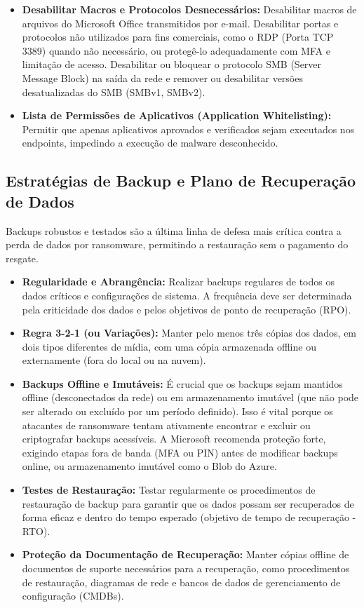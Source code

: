 \begin{itemize}
    \item \textbf{Desabilitar Macros e Protocolos Desnecessários:} Desabilitar macros de arquivos do Microsoft Office transmitidos por e-mail. Desabilitar portas e protocolos não utilizados para fins comerciais, como o RDP (Porta TCP 3389) quando não necessário, ou protegê-lo adequadamente com MFA e limitação de acesso. Desabilitar ou bloquear o protocolo SMB (Server Message Block) na saída da rede e remover ou desabilitar versões desatualizadas do SMB (SMBv1, SMBv2).
    \item \textbf{Lista de Permissões de Aplicativos (Application Whitelisting):} Permitir que apenas aplicativos aprovados e verificados sejam executados nos endpoints, impedindo a execução de malware desconhecido.
\end{itemize}

\subsection{Estratégias de Backup e Plano de Recuperação de Dados}
Backups robustos e testados são a última linha de defesa mais crítica contra a perda de dados por ransomware, permitindo a restauração sem o pagamento do resgate.
\begin{itemize}
    \item \textbf{Regularidade e Abrangência:} Realizar backups regulares de todos os dados críticos e configurações de sistema. A frequência deve ser determinada pela criticidade dos dados e pelos objetivos de ponto de recuperação (RPO).
    \item \textbf{Regra 3-2-1 (ou Variações):} Manter pelo menos três cópias dos dados, em dois tipos diferentes de mídia, com uma cópia armazenada offline ou externamente (fora do local ou na nuvem).
    \item \textbf{Backups Offline e Imutáveis:} É crucial que os backups sejam mantidos offline (desconectados da rede) ou em armazenamento imutável (que não pode ser alterado ou excluído por um período definido). Isso é vital porque os atacantes de ransomware tentam ativamente encontrar e excluir ou criptografar backups acessíveis. A Microsoft recomenda proteção forte, exigindo etapas fora de banda (MFA ou PIN) antes de modificar backups online, ou armazenamento imutável como o Blob do Azure.
    \item \textbf{Testes de Restauração:} Testar regularmente os procedimentos de restauração de backup para garantir que os dados possam ser recuperados de forma eficaz e dentro do tempo esperado (objetivo de tempo de recuperação - RTO).
    \item \textbf{Proteção da Documentação de Recuperação:} Manter cópias offline de documentos de suporte necessários para a recuperação, como procedimentos de restauração, diagramas de rede e bancos de dados de gerenciamento de configuração (CMDBs).
\end{itemize}
